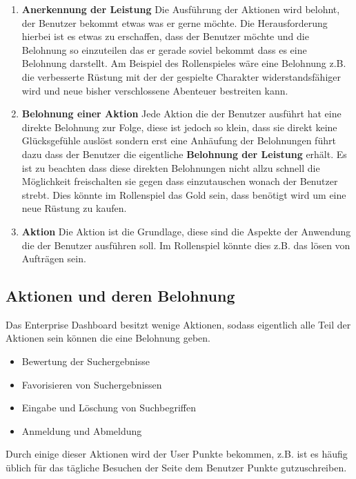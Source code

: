 \documentclass[12pt,twoside]{book}
\begin{document}
\begin{enumerate}
  \item \textbf{Anerkennung der Leistung} Die Ausführung der Aktionen wird belohnt, der Benutzer bekommt etwas was er gerne möchte. Die Herausforderung hierbei ist es etwas zu erschaffen, dass der Benutzer möchte und die Belohnung so einzuteilen das er gerade soviel bekommt dass es eine Belohnung darstellt. Am Beispiel des Rollenspieles wäre eine Belohnung z.B. die verbesserte Rüstung mit der der gespielte Charakter widerstandsfähiger wird und neue bisher verschlossene Abenteuer bestreiten kann.
  \item \textbf{Belohnung einer Aktion} Jede Aktion die der Benutzer ausführt hat eine direkte Belohnung zur Folge, diese ist jedoch so klein, dass sie direkt keine Glücksgefühle auslöst sondern erst eine Anhäufung der Belohnungen führt dazu dass der Benutzer die eigentliche \textbf{Belohnung der Leistung} erhält. Es ist zu beachten dass diese direkten Belohnungen nicht allzu schnell die Möglichkeit freischalten sie gegen dass einzutauschen wonach der Benutzer strebt. Dies könnte im Rollenspiel das Gold sein, dass benötigt wird um eine neue Rüstung zu kaufen.
  \item \textbf{Aktion} Die Aktion ist die Grundlage, diese sind die Aspekte der Anwendung die der Benutzer ausführen soll. Im Rollenspiel könnte dies z.B. das lösen von Aufträgen sein.
\end{enumerate}


\subsection*{Aktionen und deren Belohnung}

Das Enterprise Dashboard besitzt wenige Aktionen, sodass eigentlich alle Teil der Aktionen sein können die eine Belohnung geben.

\begin{itemize}
  \item Bewertung der Suchergebnisse
  \item Favorisieren von Suchergebnissen
  \item Eingabe und Löschung von Suchbegriffen
  \item Anmeldung und Abmeldung
\end{itemize}

Durch einige dieser Aktionen wird der User Punkte bekommen, z.B. ist es häufig üblich für das tägliche Besuchen der Seite dem Benutzer Punkte gutzuschreiben.
\end{document}
